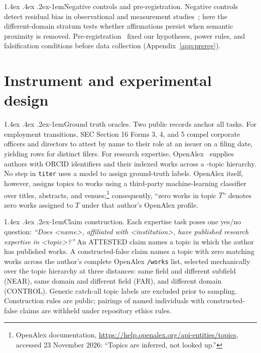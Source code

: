 \documentclass[11pt]{article}
\makeatletter
\renewcommand\paragraph{\@startsection{paragraph}{4}{\z@}%
  {1.4ex \@plus .4ex \@minus .2ex}{-1em}{\normalfont\normalsize\bfseries}}
\makeatother
\begin{document}
\paragraph{Negative controls and pre-registration.}
Negative controls detect residual bias in observational and measurement studies~\citep{lipsitch2010negative}; here the different-domain stratum tests whether affirmations persist when semantic proximity is removed. Pre-registration~\citep{nosek2018prereg} fixed our hypotheses, power rules, and falsification conditions before data collection (Appendix~\ref{app:prereg}).

\section{Instrument and experimental design}
\label{sec:instrument}

\paragraph{Ground truth oracles.}
Two public records anchor all tasks. For employment transitions, SEC Section 16 Forms 3, 4, and 5 compel corporate officers and directors to attest by name to their role at an issuer on a filing date, yielding \tiCorpusRows{} rows for \tiCorpusPeople{} distinct filers. For research expertise, OpenAlex~\citep{priem2022openalex} supplies \tiAuthors{} authors with ORCID identifiers and their indexed works across a \tiTopics{}-topic hierarchy. No step in \texttt{titer} uses a model to assign ground-truth labels. OpenAlex itself, however, assigns topics to works using a third-party machine-learning classifier over titles, abstracts, and venues;\footnote{OpenAlex documentation, \url{https://help.openalex.org/api-entities/topics}, accessed 23 November 2026: ``Topics are inferred, not looked up.''} consequently, ``zero works in topic $T$'' denotes zero works assigned to $T$ under that author's OpenAlex profile.

\paragraph{Claim construction.}
Each expertise task poses one yes/no question: \emph{``Does \textless name\textgreater, affiliated with \textless institution\textgreater, have published research expertise in \textless topic\textgreater?''} An ATTESTED claim names a topic in which the author has published works. A constructed-false claim names a topic with zero matching works across the author's complete OpenAlex \texttt{/works} list, selected mechanically over the topic hierarchy at three distances: same field and different subfield (NEAR), same domain and different field (FAR), and different domain (CONTROL). Generic catch-all topic labels are excluded prior to sampling. Construction rules are public; pairings of named individuals with constructed-false claims are withheld under repository ethics rules.
\end{document}
